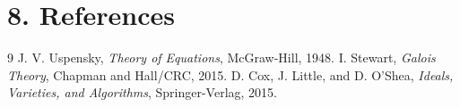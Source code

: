 \section*{8. References}
\begin{thebibliography}{9}
 J. V. Uspensky, \emph{Theory of Equations}, McGraw-Hill, 1948.
 I. Stewart, \emph{Galois Theory}, Chapman and Hall/CRC, 2015.
 D. Cox, J. Little, and D. O'Shea, \emph{Ideals, Varieties, and Algorithms}, Springer-Verlag, 2015.
\end{thebibliography}
